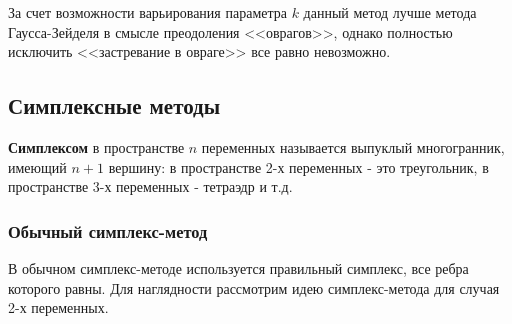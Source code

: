 \documentclass[a4paper,12pt]{report}
\begin{document}
За счет возможности варьирования параметра $k$ данный метод лучше метода Гаусса-Зейделя в смысле преодоления <<оврагов>>, однако полностью исключить <<застревание в овраге>> все равно невозможно.

\subsection{Симплексные методы}
\textbf{Симплексом} в пространстве $n$ переменных называется выпуклый многогранник, имеющий $n + 1$ вершину: в пространстве 2-х переменных - это треугольник, в пространстве 3-х переменных - тетраэдр и т.д.

\subsubsection{Обычный симплекс-метод}
В обычном симплекс-методе используется правильный симплекс, все ребра которого равны. Для наглядности рассмотрим идею симплекс-метода для случая 2-х переменных.
\end{document}
